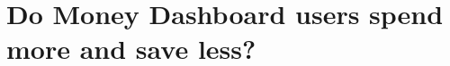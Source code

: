
\chapter{Do Money Dashboard users spend more and save less?}%
\label{cha:eval}






\begin{subappendices}
 
\end{subappendices}

